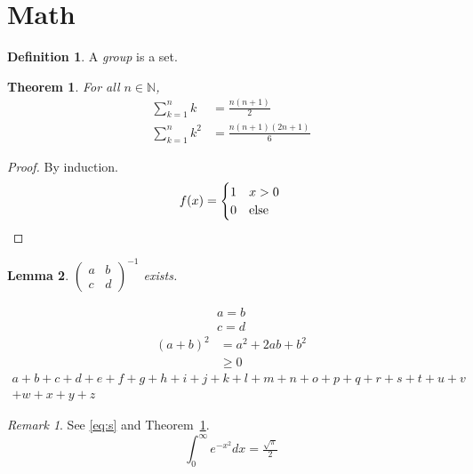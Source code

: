 \documentclass{article}
\theoremstyle{plain}\newtheorem{theorem}{Theorem}[section]\newtheorem{lemma}[theorem]{Lemma}
\theoremstyle{definition}\newtheorem{definition}{Definition}\theoremstyle{remark}\newtheorem*{remark}{Remark}
\numberwithin{equation}{section}
\begin{document}
\section{Math}
\begin{definition}A \emph{group} is a set.\end{definition}
\begin{theorem}\label{t:main}For all $n\in\mathbb N$,
\begin{align}\sum_{k=1}^n k&=\frac{n(n+1)}2\label{eq:s}\\ \sum_{k=1}^n k^2&=\frac{n(n+1)(2n+1)}6\end{align}\end{theorem}
\begin{proof}By induction.\begin{equation*}f(x)=\begin{cases}1&x>0\\0&\text{else}\end{cases}\qedhere\end{equation*}\end{proof}
\begin{lemma}$\begin{pmatrix}a&b\\c&d\end{pmatrix}^{-1}$ exists.\end{lemma}
\begin{gather}a=b\\c=d\end{gather}
\begin{equation}\begin{split}(a+b)^2&=a^2+2ab+b^2\\&\ge 0\end{split}\end{equation}
\begin{multline}a+b+c+d+e+f+g+h+i+j+k+l+m+n+o+p+q+r+s+t+u+v\\+w+x+y+z\end{multline}
\begin{remark}See \eqref{eq:s} and Theorem~\ref{t:main}. \[\int_0^\infty e^{-x^2}dx=\tfrac{\sqrt\pi}{2}\]\end{remark}
\end{document}
